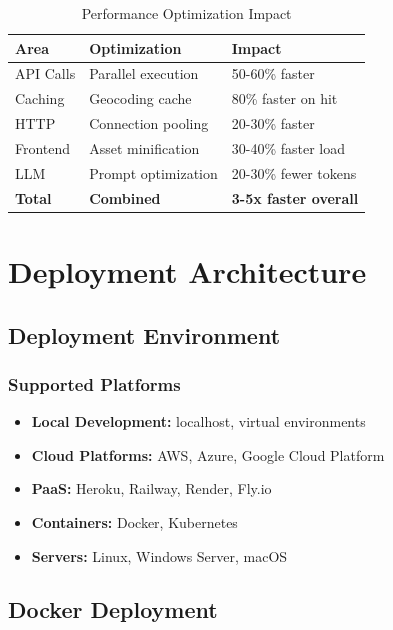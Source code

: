 \documentclass[12pt,a4paper]{report}
\begin{document}
\begin{table}[H]
\centering
\begin{tabular}{|l|l|l|}
\hline
\textbf{Area} & \textbf{Optimization} & \textbf{Impact} \\
\hline
API Calls & Parallel execution & 50-60\% faster \\
\hline
Caching & Geocoding cache & 80\% faster on hit \\
\hline
HTTP & Connection pooling & 20-30\% faster \\
\hline
Frontend & Asset minification & 30-40\% faster load \\
\hline
LLM & Prompt optimization & 20-30\% fewer tokens \\
\hline
\textbf{Total} & \textbf{Combined} & \textbf{3-5x faster overall} \\
\hline
\end{tabular}
\caption{Performance Optimization Impact}
\label{tab:perf-optimization}
\end{table}

\chapter{Deployment Architecture}

\section{Deployment Environment}

\subsection{Supported Platforms}

\begin{itemize}
    \item \textbf{Local Development:} localhost, virtual environments
    \item \textbf{Cloud Platforms:} AWS, Azure, Google Cloud Platform
    \item \textbf{PaaS:} Heroku, Railway, Render, Fly.io
    \item \textbf{Containers:} Docker, Kubernetes
    \item \textbf{Servers:} Linux, Windows Server, macOS
\end{itemize}

\section{Docker Deployment}
\end{document}
